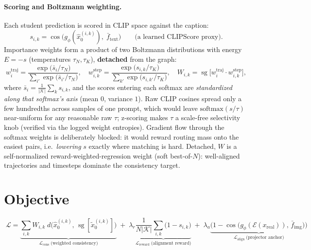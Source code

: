 \documentclass[10pt]{article}
\newcommand{\sg}{\operatorname{sg}}
\newcommand{\cossim}{\operatorname{cos}}
\newcommand{\xhat}{\hat{x}_0}
\newcommand{\xtil}{\tilde{x}_0}
\newcommand{\ftext}{\bar{f}_{\mathrm{text}}}
\newcommand{\fimg}{\bar{f}_{\mathrm{img}}}
\begin{document}
\paragraph{Scoring and Boltzmann weighting.}
Each student prediction is scored in CLIP space against the caption:
\begin{equation}
s_{i,k} = \cossim\big( g_\phi(\xhat^{(i,k)}),\; \ftext \big)
\qquad \text{(a learned CLIPScore proxy).}
\end{equation}
Importance weights form a product of two Boltzmann distributions with energy
$E = -s$ (temperatures $\tau_N, \tau_K$), \textbf{detached} from the graph:
\begin{equation}
w^{\mathrm{traj}}_i = \frac{\exp\!\big(\bar{s}_i / \tau_N\big)}{\sum_{i'} \exp\!\big(\bar{s}_{i'} / \tau_N\big)},
\quad
w^{\mathrm{step}}_{i,k} = \frac{\exp\!\big(s_{i,k} / \tau_K\big)}{\sum_{k'} \exp\!\big(s_{i,k'} / \tau_K\big)},
\quad
W_{i,k} = \sg\!\big[ w^{\mathrm{traj}}_i \cdot w^{\mathrm{step}}_{i,k} \big],
\end{equation}
where $\bar{s}_i = \tfrac{1}{|\mathcal{K}|}\sum_k s_{i,k}$, and the scores
entering each softmax are \emph{standardized along that softmax's axis}
(mean $0$, variance $1$). Raw CLIP cosines spread only a few hundredths
across samples of one prompt, which would leave $\mathrm{softmax}(s/\tau)$
near-uniform for any reasonable raw $\tau$; z-scoring makes $\tau$ a
scale-free selectivity knob (verified via the logged weight entropies).
Gradient flow through the softmax weights is deliberately blocked: it would
reward routing mass onto the easiest pairs, i.e.\ \emph{lowering} $s$ exactly
where matching is hard. Detached, $W$ is a self-normalized
reward-weighted-regression weight (soft best-of-$N$): well-aligned
trajectories and timesteps dominate the consistency target.

\section{Objective}

\begin{equation}
\boxed{\;
\mathcal{L} =
\underbrace{\sum_{i,k} W_{i,k}\;
  d\big( \xhat^{(i,k)},\, \sg[\xtil^{(i,k)}] \big)}_{\mathcal{L}_{\mathrm{cons}}\;\text{(weighted consistency)}}
\;+\; \lambda_r
\underbrace{\frac{1}{N |\mathcal{K}|} \sum_{i,k} \big( 1 - s_{i,k} \big)}_{\mathcal{L}_{\mathrm{reward}}\;\text{(alignment reward)}}
\;+\; \lambda_a
\underbrace{\Big( 1 - \cossim\big( g_\phi(\mathcal{E}(x_{\mathrm{real}})),\, \fimg \big) \Big)}_{\mathcal{L}_{\mathrm{align}}\;\text{(projector anchor)}}
\;}
\end{equation}
\end{document}

